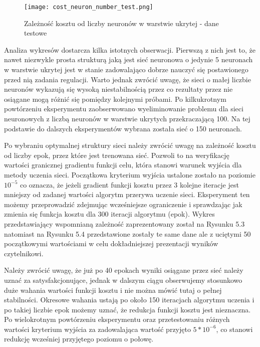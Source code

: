\begin{figure}[!h]
  \label{fig:Koszt-liczba-neuronow-testowe}
  \centering \texttt{[image: cost\_neuron\_number\_test.png]}
  \caption{Zależność kosztu od liczby neuronów w warstwie ukrytej - dane testowe}
\end{figure}

\par Analiza wykresów dostarcza kilka istotnych obserwacji. Pierwszą z nich jest to, że nawet niezwykle prosta strukturą jaką jest sieć neuronowa o jedynie 5 neuronach w warstwie ukrytej jest w stanie zadowalająco dobrze nauczyć się postawionego przed nią zadania regulacji. Warto jednak zwrócić uwagę, że sieci o małej liczbie neuronów wykazują się wysoką niestabilnością przez co rezultaty przez nie osiągane mogą różnić się pomiędzy kolejnymi próbami. Po kilkukrotnym powtórzeniu eksperymentu zaobserwowano wyeliminowanie problemu dla sieci neuronowych z liczbą neuronów w warstwie ukrytych przekraczającą 100. Na tej podstawie do dalszych eksperymentów wybrana została sieć o 150 neuronach. 
\par Po wybraniu optymalnej struktury sieci należy zwrócić uwagę na zależność kosztu od liczby epok, przez które jest trenowana sieć. Pozwoli to na weryfikację wartości granicznej gradientu funkcji celu, która stanowi warunek wyjścia dla metody uczenia sieci. Początkowa kryterium wyjścia ustalone zostało na poziomie \( 10^{-5} \) co oznacza, że jeżeli gradient funkcji kosztu przez 3 kolejne iteracje jest mniejszy od zadanej wartości algorytm przerywa uczenie sieci. Eksperyment ten możemy przeprowadzić zdejmując wcześniejsze ograniczenie i sprawdzając jak zmienia się funkcja kosztu dla 300 iteracji algorytmu (epok). Wykres przedstawiający wspomnianą zależność zaprezentowany został na Rysunku 5.3 natomiast na Rysunku 5.4 przedstawione zostały te same dane ale z uciętymi 50 początkowymi wartościami w celu dokładniejszej prezentacji wyników czytelnikowi.
\par Należy zwrócić uwagę, że już po 40 epokach wyniki osiągane przez sieć należy uznać za satysfakcjonujące, jednak w dalszym ciągu obserwujemy stosunkowo duże wahania wartości funkcji kosztu i nie można mówić tutaj o pełnej stabilności. Okresowe wahania ustają po około 150 iteracjach algorytmu uczenia i po takiej liczbie epok możemy uznać, że redukcja funkcji kosztu jest nieznaczna. Po wielokrotnym powtórzeniu eksperymentu oraz przetestowaniu różnych wartości kryterium wyjścia za zadowalająca wartość przyjęto \( 5*10^{-6} \), co stanowi redukcję wcześniej przyjętego poziomu o połowę.

